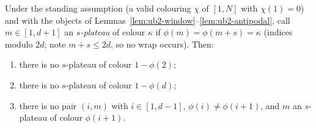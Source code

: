 \begin{lemma}\label{lem:ub2-plateau}
Under the standing assumption (a valid colouring $\chi$ of $[1,N]$ with
$\chi(1) = 0$) and with the objects of
Lemmas~\ref{lem:ub2-window}--\ref{lem:ub2-antipodal}, call $m \in [1, d+1]$
an \emph{$s$-plateau} of colour $\kappa$ if
$\phi(m) = \phi(m + s) = \kappa$ (indices modulo $2d$; note
$m + s \le 2d$, so no wrap occurs). Then:
\begin{enumerate}
\item[(V)] there is no $s$-plateau of colour $1 - \phi(2)$;
\item[(IV)] there is no $s$-plateau of colour $1 - \phi(d)$;
\item[(Cb)] there is no pair $(i, m)$ with $i \in [1, d-1]$,
$\phi(i) \ne \phi(i+1)$, and $m$ an $s$-plateau of colour $\phi(i+1)$.
\end{enumerate}
\end{lemma}

